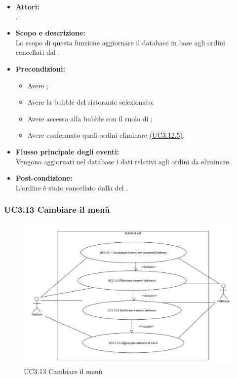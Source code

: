 \begin{itemize}
	\item \textbf{Attori:}
	\\.
	\item \textbf{Scopo e descrizione:} 
	\\Lo scopo di questa funzione aggiornare il database in base agli ordini cancellati dal .
	\item \textbf{Precondizioni:}
	\begin{itemize}
		\item Avere ;
		\item Avere la bubble del ristorante selezionato;
		\item Avere accesso alla bubble con il ruolo di ;
		\item Avere confermato quali ordini eliminare \hyperref[UC3.12.5]{(UC3.12.5)}.
	\end{itemize}
	\item \textbf{Flusso principale degli eventi:}
	\\Vengono aggiornati nel database i dati relativi agli ordini da eliminare.
	\item \textbf{Post-condizione:}
	\\L’ordine è stato cancellato dalla  del .
\end{itemize}

\subsubsection{UC3.13 Cambiare il menù} \label{UC3.13}

\begin{figure}[H]
	\centering
	\includegraphics[width=15cm]{../../documenti/AnalisiDeiRequisiti/Diagrammi_img/uc3_13.png}
	\caption{UC3.13 Cambiare il menù}
\end{figure}


